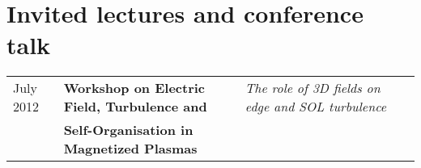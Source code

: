 \section{Invited lectures and conference talk}
\begin{longtable}{llll}
July 2012 & \textbf{Workshop on Electric Field, Turbulence and} & \textit{The role
  of 3D fields on edge and SOL turbulence} \\
& \textbf{Self-Organisation
in Magnetized Plasmas} & 
\end{longtable}
